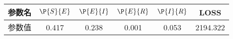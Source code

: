 \begin{tabular}{cccccc}
\hline
参数名&$\P{S}{E}$&$\P{E}{I}$&$\P{E}{R}$&$\P{I}{R}$&LOSS\\
\hline
参数值&0.417&0.238&0.001&0.053&2194.322\\
\hline
\end{tabular}